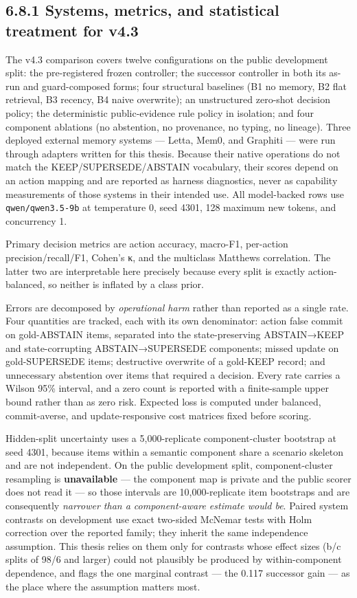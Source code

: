 \subsection{6.8.1 Systems, metrics, and statistical treatment for
v4.3}\label{systems-metrics-and-statistical-treatment-for-v4.3}

The v4.3 comparison covers twelve configurations on the public
development split: the pre-registered frozen controller; the successor
controller in both its as-run and guard-composed forms; four structural
baselines (B1 no memory, B2 flat retrieval, B3 recency, B4 naive
overwrite); an unstructured zero-shot decision policy; the deterministic
public-evidence rule policy in isolation; and four component ablations
(no abstention, no provenance, no typing, no lineage). Three deployed
external memory systems --- Letta, Mem0, and Graphiti --- were run
through adapters written for this thesis. Because their native
operations do not match the KEEP/SUPERSEDE/ABSTAIN vocabulary, their
scores depend on an action mapping and are reported as harness
diagnostics, never as capability measurements of those systems in their
intended use. All model-backed rows use \texttt{qwen/qwen3.5-9b} at
temperature 0, seed 4301, 128 maximum new tokens, and concurrency 1.

Primary decision metrics are action accuracy, macro-F1, per-action
precision/recall/F1, Cohen's κ, and the multiclass Matthews correlation.
The latter two are interpretable here precisely because every split is
exactly action-balanced, so neither is inflated by a class prior.

Errors are decomposed by \emph{operational harm} rather than reported as
a single rate. Four quantities are tracked, each with its own
denominator: action false commit on gold-ABSTAIN items, separated into
the state-preserving ABSTAIN→KEEP and state-corrupting ABSTAIN→SUPERSEDE
components; missed update on gold-SUPERSEDE items; destructive overwrite
of a gold-KEEP record; and unnecessary abstention over items that
required a decision. Every rate carries a Wilson 95\% interval, and a
zero count is reported with a finite-sample upper bound rather than as
zero risk. Expected loss is computed under balanced, commit-averse, and
update-responsive cost matrices fixed before scoring.

Hidden-split uncertainty uses a 5,000-replicate component-cluster
bootstrap at seed 4301, because items within a semantic component share
a scenario skeleton and are not independent. On the public development
split, component-cluster resampling is \textbf{unavailable} --- the
component map is private and the public scorer does not read it --- so
those intervals are 10,000-replicate item bootstraps and are
consequently \emph{narrower than a component-aware estimate would be}.
Paired system contrasts on development use exact two-sided McNemar tests
with Holm correction over the reported family; they inherit the same
independence assumption. This thesis relies on them only for contrasts
whose effect sizes (b/c splits of 98/6 and larger) could not plausibly
be produced by within-component dependence, and flags the one marginal
contrast --- the 0.117 successor gain --- as the place where the
assumption matters most.

